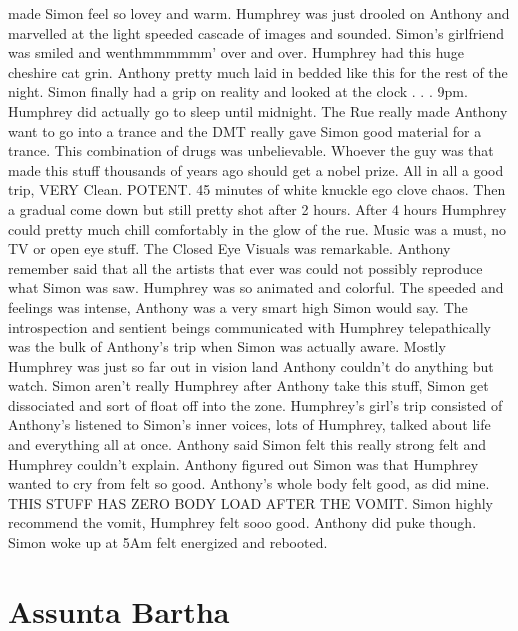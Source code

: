 \documentclass[12pt]{book}
\begin{document}
made Simon feel so lovey and warm. Humphrey was just drooled on Anthony and marvelled at the light speeded cascade of images and sounded. Simon's girlfriend was smiled and wenthmmmmmm' over and over. Humphrey had this huge cheshire cat grin. Anthony pretty much laid in bedded like this for the rest of the night. Simon finally had a grip on reality and looked at the clock . . .  9pm. Humphrey did actually go to sleep until midnight. The Rue really made Anthony want to go into a trance and the DMT really gave Simon good material for a trance. This combination of drugs was unbelievable. Whoever the guy was that made this stuff thousands of years ago should get a nobel prize. All in all a good trip, VERY Clean. POTENT. 45 minutes of white knuckle ego clove chaos. Then a gradual come down but still pretty shot after 2 hours. After 4 hours Humphrey could pretty much chill comfortably in the glow of the rue. Music was a must, no TV or open eye stuff. The Closed Eye Visuals was remarkable. Anthony remember said that all the artists that ever was could not possibly reproduce what Simon was saw. Humphrey was so animated and colorful. The speeded and feelings was intense, Anthony was a very smart high Simon would say. The introspection and sentient beings communicated with Humphrey telepathically was the bulk of Anthony's trip when Simon was actually aware. Mostly Humphrey was just so far out in vision land Anthony couldn't do anything but watch. Simon aren't really Humphrey after Anthony take this stuff, Simon get dissociated and sort of float off into the zone. Humphrey's girl's trip consisted of Anthony's listened to Simon's inner voices, lots of Humphrey, talked about life and everything all at once. Anthony said Simon felt this really strong felt and Humphrey couldn't explain. Anthony figured out Simon was that Humphrey wanted to cry from felt so good. Anthony's whole body felt good, as did mine. THIS STUFF HAS ZERO BODY LOAD AFTER THE VOMIT. Simon highly recommend the vomit, Humphrey felt sooo good. Anthony did puke though. Simon woke up at 5Am felt energized and rebooted.



\chapter{Assunta Bartha}
\end{document}

